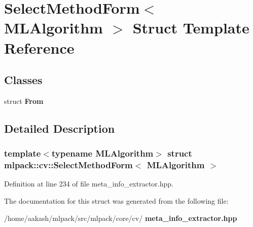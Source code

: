\section{Select\+Method\+Form$<$ M\+L\+Algorithm $>$ Struct Template Reference}
\label{structmlpack_1_1cv_1_1SelectMethodForm_3_01MLAlgorithm_01_4}
\subsection*{Classes}
\begin{DoxyCompactItemize}
\item 
struct \textbf{ From}
\end{DoxyCompactItemize}


\subsection{Detailed Description}
\subsubsection*{template$<$typename M\+L\+Algorithm$>$\newline
struct mlpack\+::cv\+::\+Select\+Method\+Form$<$ M\+L\+Algorithm $>$}



Definition at line 234 of file meta\+\_\+info\+\_\+extractor.\+hpp.



The documentation for this struct was generated from the following file\+:\begin{DoxyCompactItemize}
\item 
/home/aakash/mlpack/src/mlpack/core/cv/\textbf{ meta\+\_\+info\+\_\+extractor.\+hpp}\end{DoxyCompactItemize}
